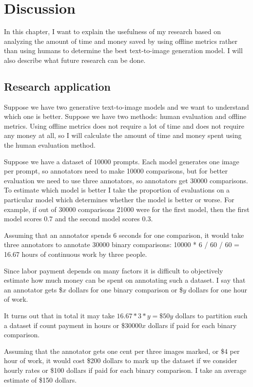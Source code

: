 \chapter{Discussion}
\label{chap:discussion}
In this chapter, I want to explain the usefulness of my research based on analyzing the amount of time and money saved by using offline metrics rather than using humans to determine the best text-to-image generation model. I will also describe what future research can be done.

\section{Research application}
Suppose we have two generative text-to-image models and we want to understand which one is better. Suppose we have two methods: human evaluation and offline metrics. Using offline metrics does not require a lot of time and does not require any money at all, so I will calculate the amount of time and money spent using the human evaluation method.


Suppose we have a dataset of 10000 prompts. Each model generates one image per prompt, so annotators need to make 10000 comparisons, but for better evaluation we need to use three annotators, so annotators get 30000 comparisons. To estimate which model is better I take the proportion of evaluations on a particular model which determines whether the model is better or worse. For example, if out of 30000 comparisons 21000 were for the first model, then the first model scores 0.7 and the second model scores 0.3.

Assuming that an annotator spends 6 seconds for one comparison, it would take three annotators to annotate 30000 binary comparisons: 10000 * 6 / 60 / 60 = 16.67 hours of continuous work by three people.

Since labor payment depends on many factors it is difficult to objectively estimate how much money can be spent on annotating such a dataset. I say that an annotator gets \$$x$ dollars for one binary comparison or \$$y$ dollars for one hour of work.

It turns out that in total it may take $16.67 * 3 * y=\$50y$ dollars to partition such a dataset if count payment in hours or \$$30000x$ dollars if paid for each binary comparison.

Assuming that the annotator gets one cent per three images marked, or \$4 per hour of work, it would cost \$200 dollars to mark up the dataset if we consider hourly rates or \$100 dollars if paid for each binary comparison. I take an average estimate of \$150 dollars.

